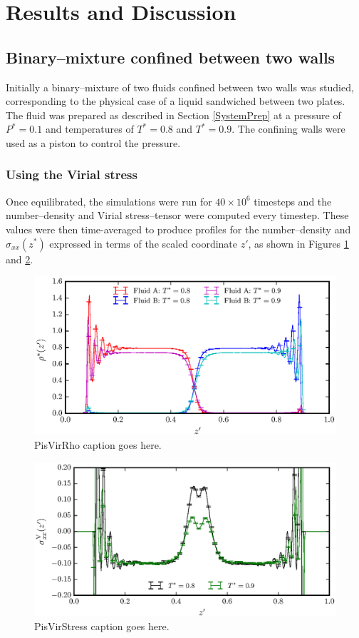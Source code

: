\section{Results and Discussion}
\subsection{Binary--mixture confined between two walls}
Initially a binary--mixture of two fluids confined between two walls was studied, corresponding to the physical case of a liquid sandwiched between two plates.
The fluid was prepared as described in Section \ref{SystemPrep} at a pressure of $P^{*} = 0.1$ and temperatures of $T^{*} = 0.8$ and $T^{*} = 0.9$.
The confining walls were used as a piston to control the pressure.

\subsubsection{Using the Virial stress}\label{VirialStressPiston}
Once equilibrated, the simulations were run for $40 \times 10^{6}$ timesteps and the number--density and Virial stress--tensor were computed every timestep.
These values were then time-averaged to produce profiles for the number--density and $\sigma_{xx}(z^{*})$ expressed in terms of the scaled coordinate $z'$, as shown in Figures \ref{PisVirRho} and \ref{PisVirStress}. 

\FloatBarrier
\begin{figure}[h]
\centering
\includegraphics[scale=0.8]{PisVirRho}
\caption{PisVirRho caption goes here.}
\label{PisVirRho}
\end{figure}

\begin{figure}[h]
\centering
\includegraphics[scale=0.8]{PisVirStress}
\caption{PisVirStress caption goes here.}
\label{PisVirStress}
\end{figure}

